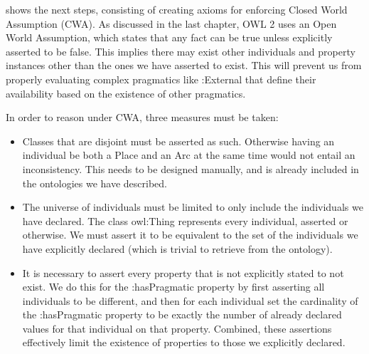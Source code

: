 	 shows the next steps, consisting of creating axioms for
	enforcing Closed World Assumption (CWA). As discussed in the last chapter, OWL
	2 uses an Open World Assumption, which states that any fact can be true unless
	explicitly asserted to be false. This implies there may exist other
	individuals and property instances other than the ones we have asserted to
	exist. This will prevent us from properly evaluating complex pragmatics like
	:External that define their availability based on the existence of other
	pragmatics. 
	
	In order to reason under CWA, three measures must be taken:
	\begin{itemize}
		\item Classes that are disjoint must be asserted as such. Otherwise having an
		individual be both a Place and an Arc at the same time would not entail an
		inconsistency. This needs to be designed manually, and is already included in
		the ontologies we have described.
		\item The universe of individuals must be limited to only include the
		individuals we have declared. The class owl:Thing represents
		every individual, asserted or otherwise. We must assert it to be equivalent to
		the set of the individuals we have explicitly declared (which is trivial to
		retrieve from the ontology).
		\item It is necessary to assert every property that is not explicitly stated
		to not exist. We do this for the :hasPragmatic property by first asserting all
		individuals to be different, and then for each individual set the cardinality
		of the :hasPragmatic property to be exactly the number of already declared
		values for that individual on that property. Combined, these assertions
		effectively limit the existence of properties to those we explicitly declared.
	\end{itemize}
	

